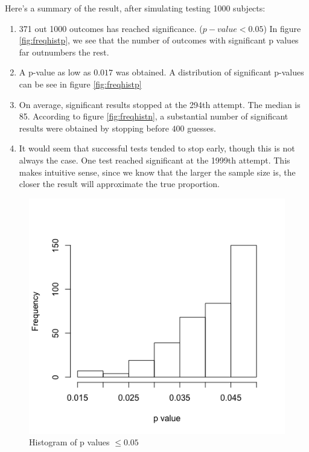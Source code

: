 Here's a summary of the result, after simulating testing 1000 subjects:

\begin{enumerate}
\def\labelenumi{\arabic{enumi}.}
\tightlist
\item
  371 out 1000 outcomes has reached significance. (\(p-value<0.05\)) In figure \ref{fig:freqhistp}, we see that the number of outcomes with significant p values far outnumbers the rest.
\item
  A p-value as low as \(0.017\) was obtained. A distribution of significant p-values can be see in figure \ref{fig:freqhistp}
\item
  On average, significant results stopped at the 294th attempt. The
  median is 85. According to figure  \ref{fig:freqhistn}, a substantial number of significant results were obtained by stopping before $400$ guesses. 
\item
  It would seem that successful tests tended to stop early, though this
  is not always the case. One test reached significant at the 1999th
  attempt. This makes intuitive sense, since we know that the larger the sample size is, the closer the result will approximate the true proportion.
\end{enumerate}

\begin{figure}[h] 
\begin{center}
\includegraphics[scale=0.4]{freqstoppval.png}
	\caption{Histogram of p values $\leq 0.05$}
	\label{fig:freqhistpval}
\end{center}	
\end{figure}

